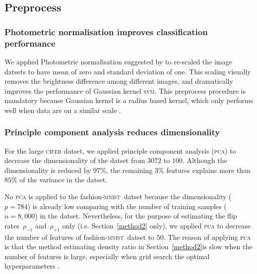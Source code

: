 \documentclass[12pt]{article} %
\newcommand{\svm}{\textsc{svm}}
\newcommand{\rhoo}{\rho_{+1}}
\newcommand{\rhoz}{\rho_{-1}}
\newcommand{\mnist}{fashion-\textsc{mnist}}
\begin{document}
\subsection{Preprocess}\label{preproc}
\subsubsection{Photometric normalisation improves classification performance}
We applied Photometric normalisation suggested by \citet{jonsson2002support} to re-scaled the image datsets to have mean of zero and standard deviation of one. This scaling visually removes the brightness difference among different images, and dramatically improves the performance of Gaussian kernel \svm . This preprocess procedure is mandatory because Gaussian kernel is a radius based kernel, which only performs well when data are on a similar scale \citep{jonsson2002support}.

\subsubsection{Principle component analysis reduces dimensionality}
For the large \textsc{cifer} datset, we applied principle component analysis (\textsc{pca}) to decrease the dimensionality of the datset from $3072$ to $100$. Although the dimensionality is reduced by $97\%$, the remaining $3\%$ features explains more than $85\%$ of the variance in the datset.

No \textsc{pca} is applied to the \mnist\ datset because the dimensionality ($p=784$) is already low comparing with the number of training samples ($n=8,000$) in the datset. Nevertheless, for the purpose of estimating the flip rates~$\rhoz$ and~$\rhoo$ only (i.e. Section~\ref{method2} only), we applied \textsc{pca} to decrease the number of features of \mnist\ datset to $50$. The reason of applying \textsc{pca} is that the method estimating density ratio in Section~\ref{method2}is slow when the number of features is large, especially when grid search the optimal hyperparameters .
\end{document}
